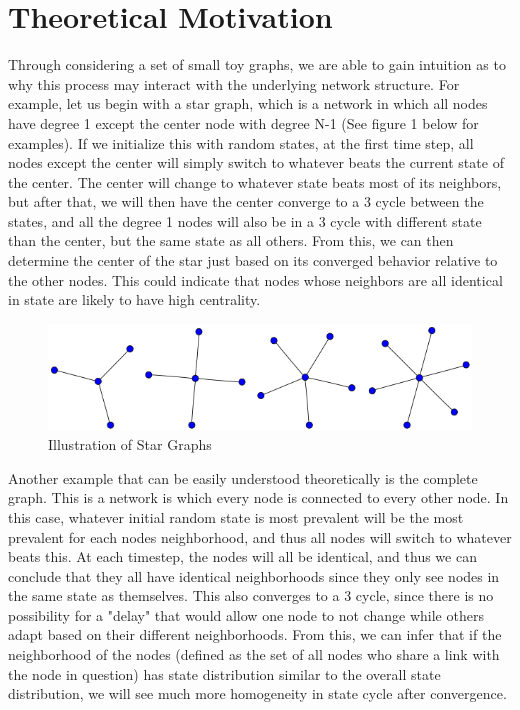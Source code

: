 \documentclass[letterpaper, 12 pt, conference]{ieeeconf}
\begin{document}
\section*{Theoretical Motivation}
Through considering a set of small toy graphs, we are able to gain intuition as to why this process may interact with the underlying network structure. For example, let us begin with a star graph, which is a network in which all nodes have degree 1 except the center node with degree N-1 (See figure 1 below for examples). If we initialize this with random states, at the first time step, all nodes except the center will simply switch to whatever beats the current state of the center. The center will change to whatever state beats most of its neighbors, but after that, we will then have the center converge to a 3 cycle between the states, and all the degree 1 nodes will also be in a 3 cycle with different state than the center, but the same state as all others. From this, we can then determine the center of the star just based on its converged behavior relative to the other nodes. This could indicate that nodes whose neighbors are all identical in state are likely to have high centrality.
\begin{figure}[ht]
    \centering
    \includegraphics[width=\columnwidth]{star.png}
    \caption{Illustration of Star Graphs}
    \label{fig:star}
\end{figure}
\newpage
Another example that can be easily understood theoretically is the complete graph. This is a network is which every node is connected to every other node. In this case, whatever initial random state is most prevalent will be the most prevalent for each nodes neighborhood, and thus all nodes will switch to whatever beats this. At each timestep, the nodes will all be identical, and thus we can conclude that they all have identical neighborhoods since they only see nodes in the same state as themselves. This also converges to a 3 cycle, since there is no possibility for a "delay" that would allow one node to not change while others adapt based on their different neighborhoods. From this, we can infer that if the neighborhood of the nodes (defined as the set of all nodes who share a link with the node in question) has state distribution similar to the overall state distribution, we will see much more homogeneity in state cycle after convergence.  
\end{document}
